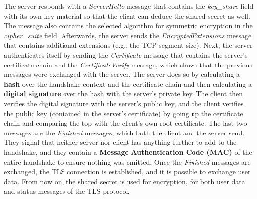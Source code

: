 \documentclass[public,noindent]{aisecreport}
\begin{document}
The server responds with a \textit{ServerHello} message that contains the \textit{key\_share} field with its own key material so that the client can deduce the shared secret as well. The message also contains the selected algorithm for symmetric encryption in the \textit{cipher\_suite} field. Afterwards, the server sends the \textit{EncryptedExtensions} message that contains additional extensions (e.g., the TCP segment size). Next, the server authenticates itself by sending the \textit{Certificate} message that contains the server's certificate chain and the \textit{CertificateVerify} message, which shows that the previous messages were exchanged with the server. The server does so by calculating a \textbf{hash} over the handshake context and the certificate chain and then calculating a \textbf{digital signature} over the hash with the server's private key. The client then verifies the digital signature with the server's public key, and the client verifies the public key (contained in the server's certificate) by going up the certificate chain and comparing the top with the client's own root certificate. The last two messages are the \textit{Finished} messages, which both the client and the server send. They signal that neither server nor client has anything further to add to the handshake, and they contain a \textbf{Message Authentication Code (MAC)} of the entire handshake to ensure nothing was omitted. Once the \textit{Finished} messages are exchanged, the TLS connection is established, and it is possible to exchange user data. From now on, the shared secret is used for encryption, for both user data and status messages of the TLS protocol. 
\end{document}
